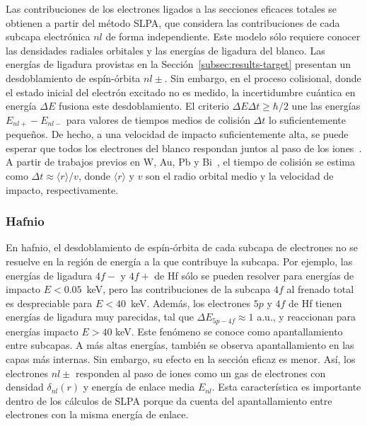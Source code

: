 Las contribuciones de los electrones ligados a las secciones eficaces 
totales se obtienen a partir del método SLPA, que considera las 
contribuciones de cada subcapa electrónica $nl$ de forma independiente.
Este modelo sólo requiere conocer las densidades radiales orbitales y
las energías de ligadura del blanco. Las energías de ligadura provistas
en la Sección~\ref{subsec:results-target} presentan un desdoblamiento de 
espín-órbita $nl\pm$. Sin embargo, en el proceso colisional, donde el 
estado inicial del electrón excitado no es medido, la incertidumbre 
cuántica en energía $\Delta E$ fusiona este desdoblamiento. El criterio 
$\Delta E\Delta t\geq\hbar/2$ une las energías $E_{nl+}-E_{nl-}$ para 
valores de tiempos medios de colisión $\Delta t$ lo suficientemente 
pequeños. De hecho, a una velocidad de impacto suficientemente alta, se 
puede esperar que todos los electrones del blanco respondan juntos al 
paso de los iones~\cite{Lindhard:53,Chu:72}. A partir de trabajos 
previos en W, Au, Pb y Bi~\cite{Montanari:09}, el tiempo de colisión se 
estima como $\Delta t\approx\langle r\rangle/v$, donde $\langle r\rangle$ 
y $v$ son el radio orbital medio y la velocidad de impacto, 
respectivamente.


\subsubsection{Hafnio}

En hafnio, el desdoblamiento de espín-órbita de cada subcapa de 
electrones no se resuelve en la región de energía a la que contribuye 
la subcapa. Por ejemplo, las energías de ligadura $4f-$ y $4f+$ de Hf 
sólo se pueden resolver para energías de impacto $E<0.05$~keV, pero las 
contribuciones de la subcapa $4f$ al frenado total es despreciable para 
$E<40$~keV. Además, los electrones $5p$ y $4f$ de Hf tienen energías de 
ligadura muy parecidas, tal que $\Delta E_{5p-4f} \approx 1$ a.u., y 
reaccionan para energías impacto $E>40$ keV. Este fenómeno se conoce 
como apantallamiento entre subcapas. A más altas energías, también se 
observa apantallamiento en las capas más internas. Sin embargo, su 
efecto en la sección eficaz es menor.
Así, los electrones $nl\pm$ responden al paso de iones como un gas de 
electrones con densidad $\delta_{nl}(r)$ y energía de enlace media 
$E_{nl}$. Esta característica es importante dentro de los cálculos de 
SLPA porque da cuenta del apantallamiento entre electrones con la misma 
energía de enlace. 

